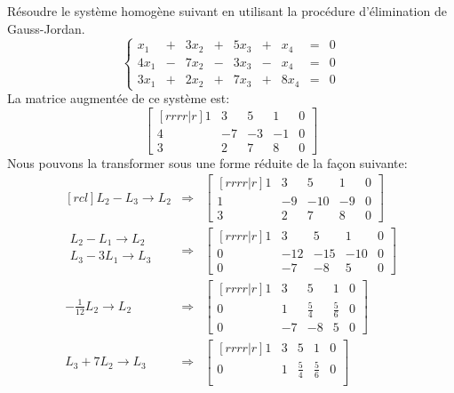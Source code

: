 \begin{exemple}
	Résoudre le système homogène suivant en utilisant la procédure d'élimination de Gauss-Jordan.
	\[
	\left\{
	\begin{matrix}
	x_1 &+& 3x_2 &+& 5x_3 &+& x_4 &=& 0 \\
	4x_1 &-& 7x_2 &-& 3x_3 &-& x_4 &=& 0\\
	3x_1 &+& 2x_2 &+& 7x_3 &+& 8x_4 &=& 0
	\end{matrix}
	\right.
	\]
	\vspace*{-25pt}\solution
	La matrice augmentée de ce système est:
	\[
	\begin{bmatrix}[rrrr|r]
	1 & 3 & 5 & 1 & 0 \\
	4 &-7&-3&-1& 0 \\
	3 & 2 & 7 & 8 & 0
	\end{bmatrix}
	\]
	Nous pouvons la transformer sous une forme réduite de la façon suivante:
	\[
	\begin{matrix}[rcl]
		L_2 - L_3 \rightarrow L_2
		&\Longrightarrow&
		\begin{bmatrix}[rrrr|r]
		1 & 3 & 5 & 1 & 0 \\
		1 &-9&-10&-9& 0 \\
		3 & 2 & 7 & 8 & 0
		\end{bmatrix}
	\\[20pt]
		\begin{matrix}
		L_2 - L_1 \rightarrow L_2 \\
		L_3 - 3L_1 \rightarrow L_3\\
		\end{matrix}
		&\Longrightarrow&
		\begin{bmatrix}[rrrr|r]
		1 & 3 & 5 & 1 & 0 \\
		0 &-12&-15&-10& 0 \\
		0 & -7 & -8 & 5 & 0
		\end{bmatrix}
	\\[20pt]
		-\frac{1}{12} L_2 \rightarrow L_2
		&\Longrightarrow&
		\begin{bmatrix}[rrrr|r]
		1 & 3 & 5 & 1 & 0 \\[5pt]
		0 & 1&\frac{5}{4}&\frac{5}{6}& 0 \\[5pt]
		0 & -7 & -8 & 5 & 0
		\end{bmatrix}
	\\[20pt]
		L_3 + 7L_2 \rightarrow L_3
		&\Longrightarrow&
		\begin{bmatrix}[rrrr|r]
		1 & 3 & 5 & 1 & 0 \\[5pt]
		0 & 1&\frac{5}{4}&\frac{5}{6}& 0 \\[5pt]

\end{bmatrix}
\end{matrix}\]
\end{exemple}
